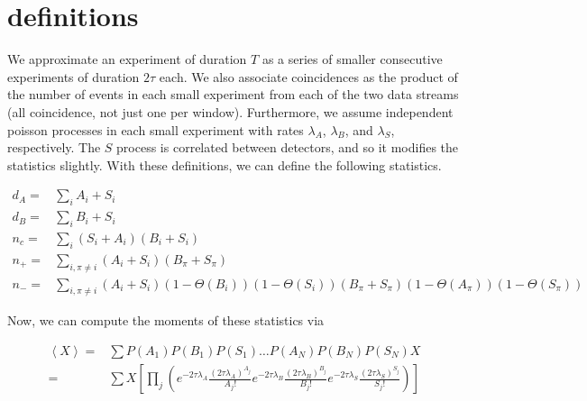 \documentclass{article}
\newcommand{\step}[1]{\Theta\left(#1\right)}
\newcommand{\e}[1]{\left<#1\right>}
\newcommand{\rate}[1]{\lambda_{#1}}
\newcommand{\la}{\rate{A}}
\newcommand{\lb}{\rate{B}}
\newcommand{\ls}{\rate{S}}
\begin{document}

\section{definitions}

We approximate an experiment of duration $T$ as a series of smaller consecutive experiments of duration $2\tau$ each.
We also associate coincidences as the product of the number of events in each small experiment from each of the two data streams (all coincidence, not just one per window).
Furthermore, we assume independent poisson processes in each small experiment with rates $\la$, $\lb$, and $\ls$, respectively.
The $S$ process is correlated between detectors, and so it modifies the statistics slightly.
With these definitions, we can define the following statistics.

\begin{subequations}
	\begin{align}
		d_A = & \sum\limits_i A_i + S_i \\
		d_B = & \sum\limits_i B_i + S_i \\
		n_c = & \sum\limits_i \left(S_i + A_i\right)\left(B_i + S_i\right) \\
		n_+ = & \sum\limits_{i,\pi \neq i} \left(A_i + S_i\right) \left(B_\pi + S_\pi\right) \\
		n_- = & \sum\limits_{i,\pi \neq i} \left(A_i + S_i\right) \left(1-\step{B_i}\right) \left(1-\step{S_i}\right) \left(B_\pi + S_\pi\right) \left(1-\step{A_\pi}\right) \left(1-\step{S_\pi}\right) 
	\end{align}
\end{subequations}

\noindent
Now, we can compute the moments of these statistics via

\begin{subequations}
	\begin{align}
		\e{X} = & \sum P\left(A_1\right) P\left(B_1\right) P\left(S_1\right) \ldots P(A_N) P(B_N) P(S_N) X \\
		      = & \sum X \left[\prod\limits_{j} \left(e^{-2\tau\la} \frac{\left(2\tau\la\right)^{A_j}}{A_j!} e^{-2\tau\lb} \frac{\left(2\tau\lb\right)^{B_j}}{B_j!} e^{-2\tau\ls} \frac{\left(2\tau\ls\right)^{S_j}}{S_j!}\right)\right] 
	\end{align}
\end{subequations}

\end{document}
